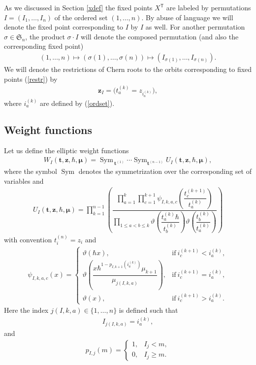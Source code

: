 \documentclass[10pt,a4paper]{amsart}
\DeclareMathOperator\Sym{Sym}
\newcommand{\bT}{\mathsf{T}}
\def\ttt{{\boldsymbol t}}
\def\zz{{\boldsymbol z}}
\def\mub{{\boldsymbol\mu}}
\let\thi\vartheta
\numberwithin{equation}{section}
\begin{document}
As we discussed in Section \ref{xdef} the fixed points $X^{\bT}$ are labeled by permutations $I=(I_1,\dots, I_n)$ of the ordered set $(1,\dots, n)$. By abuse of language we will denote the fixed point corresponding to $I$ by $I$ as well. For another permutation $\sigma \in \mathfrak{S}_n$, the product $\sigma\cdot I$ will denote the composed permutation (and also the corresponding fixed point)
\begin{gather*}
(1, \dots, n) \mapsto (\sigma (1), \dots, \sigma (n)) \mapsto (I_{\sigma (1)}, \dots, I_{\sigma (n)} ).
\end{gather*}
We  will denote the restrictions of Chern roots to the orbits corresponding to fixed points (\ref{restr}) by
\begin{gather} \label{fpres}
\zz_{I}=\big(t^{(k)}_{a}=z_{i^{(k)}_a}\big) ,
\end{gather}
where $i^{(k)}_a$ are defined by (\ref{ordset}).

\subsection{Weight functions}
Let us define the elliptic weight functions
\begin{gather} \label{WI2}
W_I(\ttt,\zz,\hbar,\mub) =\Sym_{\>\ttt^{(1)}} \cdots \Sym_{\ttt^{(n-1)}} U_I(\ttt,\zz,\hbar,\mub),
\end{gather}
where the symbol $\Sym$ denotes the symmetrization over the corresponding set of variables and
\begin{gather*}%
U_I(\ttt,\zz,\hbar,\mub) =\prod\limits_{k=1}^{n-1} \left(
\dfrac{\prod\limits_{a=1}^{k} \prod\limits_{c=1}^{k+1} \psi_{I,k,a,c} \left( \dfrac{t^{(k+1)}_c}{t^{(k)}_a} \right) }{\prod\limits_{1 \leq a<b \leq k } \thi \left( \dfrac{t^{(k)}_a \hbar}{t^{(k)}_b} \right) \thi \left( \dfrac{t^{(k)}_b}{t^{(k)}_a} \right) }\right)
\end{gather*}
with convention $t^{(n)}_{i}=z_{i}$ and
\begin{gather*}%
\psi_{I,k,a,c}(x) = \begin{cases}
 \thi(\hbar x) ,& \text{if} \ i^{(k+1)}_c<i^{(k)}_a,\\
 \displaystyle
 {\thi \left( \dfrac{x\hbar^{1 -p_{I,k+1}(i_a^{(k)})}
 \mu_{k+1} }{ \mu_{j(I,k,a)} } \right)} , &
 \text{if} \ i^{(k+1)}_c=i^{(k)}_a, \\
 \thi(x),& \text{if} \ i^{(k+1)}_c>i^{(k)}_a .
\end{cases}
\end{gather*}
Here the index $j(I,k,a) \in \{1, \dots, n \}$ is defined such that
\begin{gather*}
I_{j (I, k, a)} = i_a^{(k)},
\end{gather*}
and
\begin{gather} \label{p-function}
p_{I, j} (m) = \begin{cases}
 1, & I_j <m, \\
 0 , & I_j \geq m.
\end{cases}
\end{gather}
\end{document}
